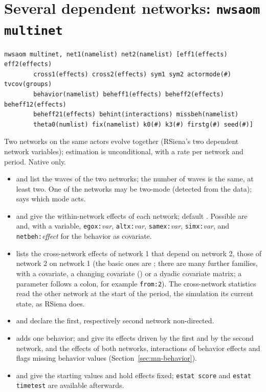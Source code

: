 \section{Several dependent networks: \texttt{nwsaom multinet}}

\begin{lstlisting}
nwsaom multinet, net1(namelist) net2(namelist) [eff1(effects) eff2(effects)
        cross1(effects) cross2(effects) sym1 sym2 actormode(#) tvcov(groups)
        behavior(namelist) beheff1(effects) beheff2(effects) beheff12(effects)
        beheff21(effects) behint(interactions) missbeh(namelist)
        theta0(numlist) fix(namelist) k0(#) k3(#) firstg(#) seed(#)]
\end{lstlisting}
Two networks on the same actors evolve together (RSiena's two dependent network variables); estimation is unconditional, with a rate per network and period. Native only.
\begin{itemize}[nosep]
  \item {} and  list the waves of the two networks; the number of waves is the same, at least two. One of the networks may be two-mode (detected from the data);  says which mode acts.
  \item {} and  give the within-network effects of each network; default . Possible are  and, with a variable, \texttt{egox:}\emph{var}, \texttt{altx:}\emph{var}, \texttt{samex:}\emph{var}, \texttt{simx:}\emph{var}, and \texttt{netbeh:}\emph{effect} for the behavior as covariate.
  \item {} lists the cross-network effects of network 1 that depend on network 2,  those of network 2 on network 1 (the basic ones are ; there are many further families, with a covariate, a changing covariate () or a dyadic covariate matrix; a parameter follows a colon, for example \texttt{from:2}). The cross-network statistics read the other network at the start of the period, the simulation its current state, as RSiena does.
  \item {} and  declare the first, respectively second network non-directed.
  \item {} adds one behavior;  and  give its effects driven by the first and by the second network,  and  the effects of both networks,  interactions of behavior effects and  flags missing behavior values (Section~\ref{sec:mn-behavior}).
  \item {} and  give the starting values and hold effects fixed; \texttt{estat score} and \texttt{estat timetest} are available afterwards.
\end{itemize}

